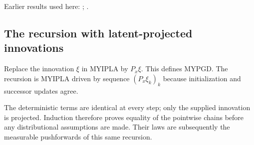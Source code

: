 \documentclass[11pt,a4paper]{report}
\begin{document}
Earlier results used here: \cite[Section~3.33]{LangevinLean2026ULASC}; \cite[Section~3.41]{LangevinLean2026ULASC}.
\subsection{\texorpdfstring{The recursion with latent-projected innovations}{The recursion with latent-projected innovations}}
\label{report-step-ProximalLangevin-MYPGDAlgorithm-lean-1}


Replace the innovation \(\xi\) in MYIPLA by \(P_x\xi\). This defines MYPGD. The recursion is MYIPLA driven by sequence \((P_x\xi_k)_k\) because initialization and successor updates agree.



The deterministic terms are identical at every step; only the supplied innovation is projected. Induction therefore proves equality of the pointwise chains before any distributional assumptions are made. Their laws are subsequently the measurable pushforwards of this same recursion.
\end{document}
